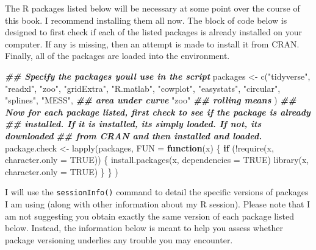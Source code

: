 \documentclass[
]{book}
\newenvironment{Shaded}{\begin{snugshade}}{\end{snugshade}}
\newcommand{\AttributeTok}[1]{\textcolor[rgb]{0.77,0.63,0.00}{#1}}
\newcommand{\ConstantTok}[1]{\textcolor[rgb]{0.00,0.00,0.00}{#1}}
\newcommand{\ControlFlowTok}[1]{\textcolor[rgb]{0.13,0.29,0.53}{\textbf{#1}}}
\newcommand{\DocumentationTok}[1]{\textcolor[rgb]{0.56,0.35,0.01}{\textbf{\textit{#1}}}}
\newcommand{\FunctionTok}[1]{\textcolor[rgb]{0.00,0.00,0.00}{#1}}
\newcommand{\NormalTok}[1]{#1}
\newcommand{\OtherTok}[1]{\textcolor[rgb]{0.56,0.35,0.01}{#1}}
\newcommand{\SpecialCharTok}[1]{\textcolor[rgb]{0.00,0.00,0.00}{#1}}
\newcommand{\StringTok}[1]{\textcolor[rgb]{0.31,0.60,0.02}{#1}}
\begin{document}
The R packages listed below will be necessary at some point over the course of
this book. I recommend installing them all now. The block of code below is
designed to first check if each of the listed packages is already installed on
your computer. If any is missing, then an attempt is made to install it from
CRAN. Finally, all of the packages are loaded into the environment.

\begin{Shaded}
\begin{Highlighting}[]
\DocumentationTok{\#\# Specify the packages you\textquotesingle{}ll use in the script}
\NormalTok{packages }\OtherTok{\textless{}{-}} \FunctionTok{c}\NormalTok{(}\StringTok{"tidyverse"}\NormalTok{,}
              \StringTok{"readxl"}\NormalTok{,}
              \StringTok{"zoo"}\NormalTok{,}
              \StringTok{"gridExtra"}\NormalTok{,}
              \StringTok{"R.matlab"}\NormalTok{,}
              \StringTok{"cowplot"}\NormalTok{,}
              \StringTok{"easystats"}\NormalTok{,}
              \StringTok{"circular"}\NormalTok{,}
              \StringTok{"splines"}\NormalTok{,}
              \StringTok{"MESS"}\NormalTok{, }\DocumentationTok{\#\# area under curve}
              \StringTok{"zoo"} \DocumentationTok{\#\# rolling means}
\NormalTok{)}
\DocumentationTok{\#\# Now for each package listed, first check to see if the package is already}
\DocumentationTok{\#\# installed. If it is installed, it\textquotesingle{}s simply loaded. If not, it\textquotesingle{}s downloaded }
\DocumentationTok{\#\# from CRAN and then installed and loaded.}
\NormalTok{package.check }\OtherTok{\textless{}{-}} \FunctionTok{lapply}\NormalTok{(packages,}
                        \AttributeTok{FUN =} \ControlFlowTok{function}\NormalTok{(x) \{}
                          \ControlFlowTok{if}\NormalTok{ (}\SpecialCharTok{!}\FunctionTok{require}\NormalTok{(x, }\AttributeTok{character.only =} \ConstantTok{TRUE}\NormalTok{)) \{}
                            \FunctionTok{install.packages}\NormalTok{(x, }\AttributeTok{dependencies =} \ConstantTok{TRUE}\NormalTok{)}
                            \FunctionTok{library}\NormalTok{(x, }\AttributeTok{character.only =} \ConstantTok{TRUE}\NormalTok{)}
\NormalTok{                          \}}
\NormalTok{                        \}}
\NormalTok{)}
\end{Highlighting}
\end{Shaded}

I will use the \texttt{sessionInfo()} command to detail the specific versions of
packages I am using (along with other information about my R session). Please
note that I am not suggesting you obtain exactly the same version of each
package listed below. Instead, the information below is meant to help you assess
whether package versioning underlies any trouble you may encounter.
\end{document}
